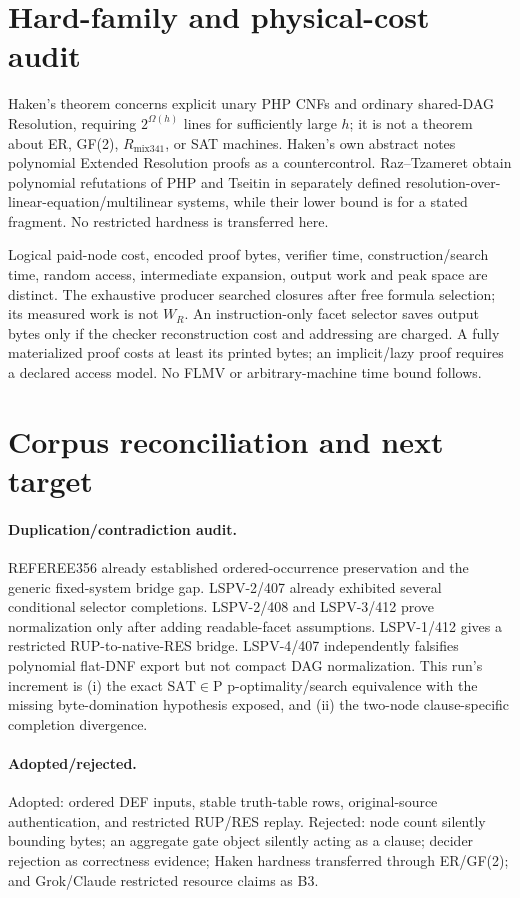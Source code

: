 \documentclass[11pt]{article}
\begin{document}
\section{Hard-family and physical-cost audit}

Haken's theorem concerns explicit unary PHP CNFs and ordinary shared-DAG Resolution, requiring $2^{\Omega(h)}$ lines for sufficiently large $h$; it is not a theorem about ER, GF(2), $R_{\mathrm{mix341}}$, or SAT machines.  Haken's own abstract notes polynomial Extended Resolution proofs as a countercontrol.  Raz--Tzameret obtain polynomial refutations of PHP and Tseitin in separately defined resolution-over-linear-equation/multilinear systems, while their lower bound is for a stated fragment.  No restricted hardness is transferred here.

Logical paid-node cost, encoded proof bytes, verifier time, construction/search time, random access, intermediate expansion, output work and peak space are distinct.  The exhaustive producer searched closures after free formula selection; its measured work is not $W_R$.  An instruction-only facet selector saves output bytes only if the checker reconstruction cost and addressing are charged.  A fully materialized proof costs at least its printed bytes; an implicit/lazy proof requires a declared access model.  No FLMV or arbitrary-machine time bound follows.

\section{Corpus reconciliation and next target}

\paragraph{Duplication/contradiction audit.}
REFEREE356 already established ordered-occurrence preservation and the generic fixed-system bridge gap.  LSPV-2/407 already exhibited several conditional selector completions.  LSPV-2/408 and LSPV-3/412 prove normalization only after adding readable-facet assumptions.  LSPV-1/412 gives a restricted RUP-to-native-RES bridge.  LSPV-4/407 independently falsifies polynomial flat-DNF export but not compact DAG normalization.  This run's increment is (i) the exact $\mathrm{SAT}\in\mathrm P$ p-optimality/search equivalence with the missing byte-domination hypothesis exposed, and (ii) the two-node clause-specific completion divergence.

\paragraph{Adopted/rejected.}
Adopted: ordered DEF inputs, stable truth-table rows, original-source authentication, and restricted RUP/RES replay.  Rejected: node count silently bounding bytes; an aggregate gate object silently acting as a clause; decider rejection as correctness evidence; Haken hardness transferred through ER/GF(2); and Grok/Claude restricted resource claims as B3.
\end{document}
